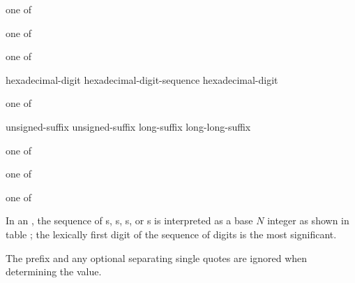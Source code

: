 \documentclass{wg21}
\begin{document}
\begin{bnf}
     \textnormal{one of}\br
\end{bnf}

\begin{bnf}
     \textnormal{one of}\br
\end{bnf}

\begin{bnf}
     \textnormal{one of}\br
\end{bnf}

\begin{bnf}
    \br
    hexadecimal-digit\br
    hexadecimal-digit-sequence  hexadecimal-digit
\end{bnf}

\begin{bnf}
     \textnormal{one of}\br
    \br
    \br
\end{bnf}

\begin{bnf}
    \br
    unsigned-suffix  \br
    unsigned-suffix  \br
    long-suffix  \br
    long-long-suffix 
\end{bnf}

\begin{bnf}
     \textnormal{one of}\br
\end{bnf}

\begin{bnf}
     \textnormal{one of}\br
\end{bnf}

\begin{bnf}
     \textnormal{one of}\br
\end{bnf}

\pnum
{}%
%
%
In an ,
the sequence of
s,
s,
s, or
s
is interpreted as a base $N$ integer as shown in table ;
the lexically first digit of the sequence of digits is the most significant.
\begin{note}
    The prefix and any optional separating single quotes are ignored
    when determining the value.
\end{note}
\end{document}
